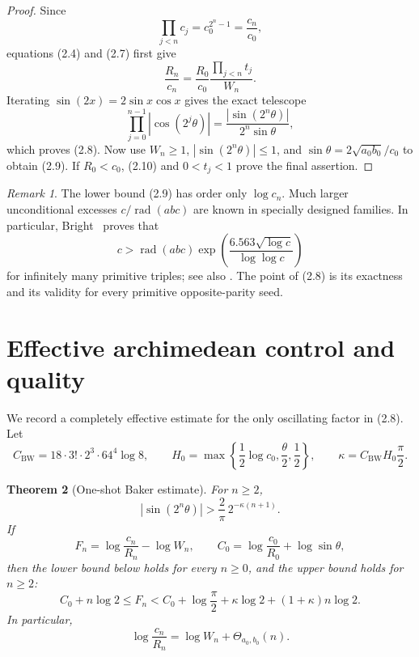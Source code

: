 \documentclass[11pt]{article}
\newtheorem{theorem}{Theorem}
\theoremstyle{remark}
\newtheorem{remark}[theorem]{Remark}
\newcommand{\rad}{\operatorname{rad}}
\begin{document}
\begin{proof}
Since
\[
 \prod_{j<n}c_j=c_0^{2^n-1}=\frac{c_n}{c_0},
\]
equations (2.4) and (2.7) first give
\[
 \frac{R_n}{c_n}
 =\frac{R_0}{c_0}\frac{\prod_{j<n}t_j}{W_n}.              \tag{2.10}
\]
Iterating \(\sin(2x)=2\sin x\cos x\) gives the exact telescope
\[
 \prod_{j=0}^{n-1}|\cos(2^j\theta)|
 =\frac{|\sin(2^n\theta)|}{2^n\sin\theta},                \tag{2.11}
\]
which proves (2.8).  Now use \(W_n\geq1\),
\(|\sin(2^n\theta)|\leq1\), and
\(\sin\theta=2\sqrt{a_0b_0}/c_0\) to obtain (2.9).
If \(R_0<c_0\), (2.10) and \(0<t_j<1\) prove the final assertion.
\end{proof}

\begin{remark}
The lower bound (2.9) has order only \(\log c_n\).  Much larger
unconditional excesses \(c/\rad(abc)\) are known in specially designed
families.  In particular, Bright~\cite{Bright2024} proves that
\[
 c>\rad(abc)\exp\left(
  \frac{6.563\sqrt{\log c}}{\log\log c}\right)
\]
for infinitely many primitive triples; see also
\cite{GranvilleTucker2002,AlvarezEtAl2023}.  The point of (2.8) is its
exactness and its validity for every primitive opposite-parity seed.
\end{remark}

\section{Effective archimedean control and quality}

We record a completely effective estimate for the only oscillating factor
in (2.8).  Let
\[
 C_{\mathrm{BW}}
 =18\cdot3!\cdot2^3\cdot64^4\log8,\qquad
 H_0=\max\left\{\frac12\log c_0,\frac{\theta}{2},\frac12\right\},
\qquad
 \kappa=C_{\mathrm{BW}}H_0\frac{\pi}{2}.                  \tag{3.1}
\]

\begin{theorem}[One-shot Baker estimate]\label{thm:baker}
For \(n\geq2\),
\[
 |\sin(2^n\theta)|>\frac{2}{\pi}\,2^{-\kappa(n+1)}.        \tag{3.2}
\]
If
\[
 F_n=\log\frac{c_n}{R_n}-\log W_n,\qquad
 C_0=\log\frac{c_0}{R_0}+\log\sin\theta,
\]
then the lower bound below holds for every \(n\geq0\), and the upper
bound holds for \(n\geq2\):
\[
 C_0+n\log2
 \leq F_n
 <C_0+\log\frac{\pi}{2}+\kappa\log2
      +(1+\kappa)n\log2.                                  \tag{3.3}
\]
In particular,
\[
 \log\frac{c_n}{R_n}=\log W_n+\Theta_{a_0,b_0}(n).        \tag{3.4}
\]
\end{theorem}
\end{document}
